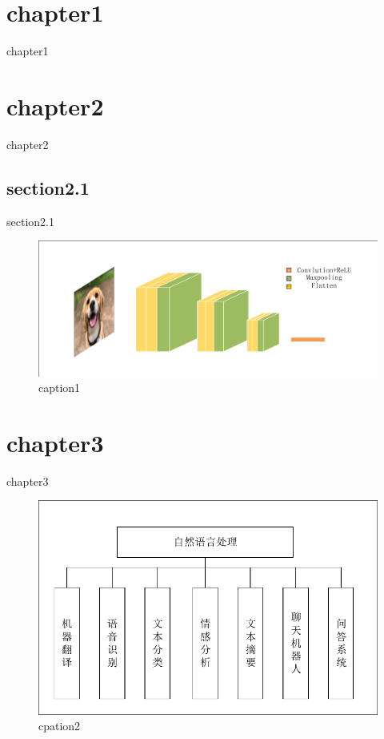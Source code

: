 \chapter{chapter1}
\songti
\setcounter{page}{1}

chapter1
\chapter{chapter2}
chapter2

\section{section2.1}
section2.1

\begin{figure}[H]
	\centering
	\includegraphics[width=120mm]{image/img02.pdf}
	\caption{caption1}
\end{figure}



\chapter{chapter3}
chapter3

\begin{figure}[H]
	\centering
	\includegraphics[width=120mm]{image/img03.pdf}
	\caption{cpation2}
\end{figure}




